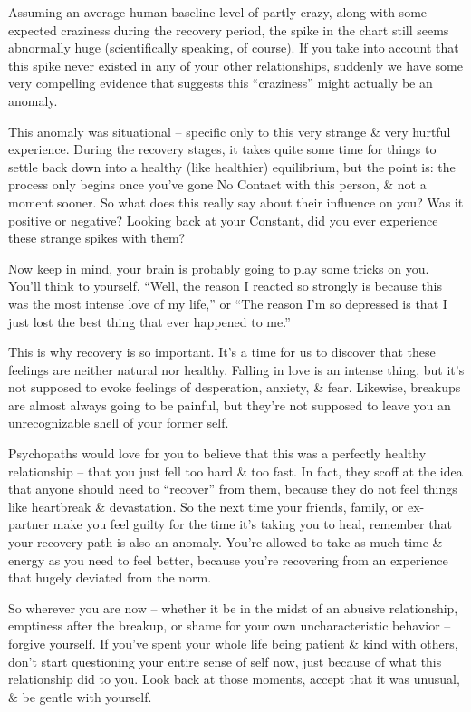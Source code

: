 \documentclass{article}
\numberwithin{equation}{section}
\begin{document}
Assuming an average human baseline level of partly crazy, along with some expected craziness during the recovery period, the spike in the chart still seems abnormally huge (scientifically speaking, of course). If you take into account that this spike never existed in any of your other relationships, suddenly we have some very compelling evidence that suggests this ``craziness'' might actually be an anomaly.

This anomaly was situational -- specific only to this very strange \& very hurtful experience. During the recovery stages, it takes quite some time for things to settle back down into a healthy (like healthier) equilibrium, but the point is: the process only begins once you've gone No Contact with this person, \& not a moment sooner. So what does this really say about their influence on you? Was it positive or negative? Looking back at your Constant, did you ever experience these strange spikes with them?

Now keep in mind, your brain is probably going to play some tricks on you. You'll think to yourself, ``Well, the reason I reacted so strongly is because this was the most intense love of my life,'' or ``The reason I'm so depressed is that I just lost the best thing that ever happened to me.''

This is why recovery is so important. It's a time for us to discover that these feelings are neither natural nor healthy. Falling in love is an intense thing, but it's not supposed to evoke feelings of desperation, anxiety, \& fear. Likewise, breakups are almost always going to be painful, but they're not supposed to leave you an unrecognizable shell of your former self.

Psychopaths would love for you to believe that this was a perfectly healthy relationship -- that you just fell too hard \& too fast. In fact, they scoff at the idea that anyone should need to ``recover'' from them, because they do not feel things like heartbreak \& devastation. So the next time your friends, family, or ex-partner make you feel guilty for the time it's taking you to heal, remember that your recovery path is also an anomaly. You're allowed to take as much time \& energy as you need to feel better, because you're recovering from an experience that hugely deviated from the norm.

So wherever you are now -- whether it be in the midst of an abusive relationship, emptiness after the breakup, or shame for your own uncharacteristic behavior -- forgive yourself. If you've spent your whole life being patient \& kind with others, don't start questioning your entire sense of self now, just because of what this relationship did to you. Look back at those moments, accept that it was unusual, \& be gentle with yourself.
\end{document}
